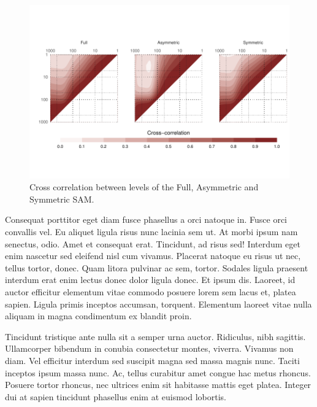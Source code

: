 \documentclass[twocol]{ametsocV5}
\begin{document}
\begin{figure}
\includegraphics{cross-correlation-1} \caption[Cross correlation between levels of the Full, Asymmetric and Symmetric SAM]{Cross correlation between levels of the Full, Asymmetric and Symmetric SAM.}\label{fig:cross-correlation}
\end{figure}

Consequat porttitor eget diam fusce phasellus a orci natoque in. Fusce
orci convallis vel. Eu aliquet ligula risus nunc lacinia sem ut. At
morbi ipsum nam senectus, odio. Amet et consequat erat. Tincidunt, ad
risus sed! Interdum eget enim nascetur sed eleifend nisl cum vivamus.
Placerat natoque eu risus ut nec, tellus tortor, donec. Quam litora
pulvinar ac sem, tortor. Sodales ligula praesent interdum erat enim
lectus donec dolor ligula donec. Et ipsum dis. Laoreet, id auctor
efficitur elementum vitae commodo posuere lorem sem lacus et, platea
sapien. Ligula primis inceptos accumsan, torquent. Elementum laoreet
vitae nulla aliquam in magna condimentum ex blandit proin.

Tincidunt tristique ante nulla sit a semper urna auctor. Ridiculus, nibh
sagittis. Ullamcorper bibendum in conubia consectetur montes, viverra.
Vivamus non diam. Vel efficitur interdum sed suscipit magna sed massa
magnis nunc. Taciti inceptos ipsum massa nunc. Ac, tellus curabitur amet
congue hac metus rhoncus. Posuere tortor rhoncus, nec ultrices enim sit
habitasse mattis eget platea. Integer dui at sapien tincidunt phasellus
enim at euismod lobortis.
\end{document}
